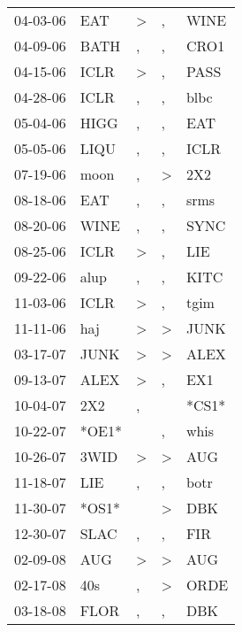 \begin{supertabular}{lllll}
 04-03-06 &    EAT &     \textgreater &                , &   WINE \\
 04-09-06 &   BATH &                , &                , &   CRO1 \\
 04-15-06 &   ICLR &     \textgreater &                , &   PASS \\
 04-28-06 &   ICLR &                , &                , &   blbc \\
 05-04-06 &   HIGG &                , &                , &    EAT \\
 05-05-06 &   LIQU &                , &                , &   ICLR \\
 07-19-06 &   moon &                , &     \textgreater &    2X2 \\
 08-18-06 &    EAT &                , &                , &   srms \\
 08-20-06 &   WINE &                , &                , &   SYNC \\
 08-25-06 &   ICLR &     \textgreater &                , &    LIE \\
 09-22-06 &   alup &                , &                , &   KITC \\
 11-03-06 &   ICLR &     \textgreater &                , &   tgim \\
 11-11-06 &    haj &     \textgreater &     \textgreater &   JUNK \\
 03-17-07 &   JUNK &     \textgreater &     \textgreater &   ALEX \\
 09-13-07 &   ALEX &     \textgreater &                , &    EX1 \\
 10-04-07 &    2X2 &                , &                  &  *CS1* \\
 10-22-07 &  *OE1* &                  &                , &   whis \\
 10-26-07 &   3WID &     \textgreater &     \textgreater &    AUG \\
 11-18-07 &    LIE &                , &                , &   botr \\
 11-30-07 &  *OS1* &                  &     \textgreater &    DBK \\
 12-30-07 &   SLAC &                , &                , &    FIR \\
 02-09-08 &    AUG &     \textgreater &     \textgreater &    AUG \\
 02-17-08 &    40s &                , &     \textgreater &   ORDE \\
 03-18-08 &   FLOR &                , &                , &    DBK \\

\end{supertabular}
